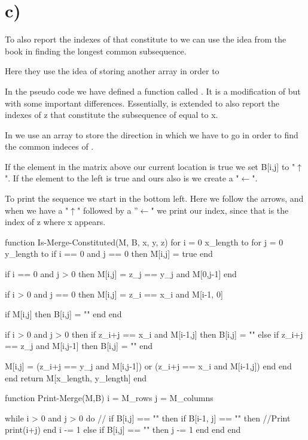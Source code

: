 \documentclass{article}
\begin{document}
\section*{c)}
To also report the indexes of  that constitute to  we can use the idea from the book in finding the longest common subsequence.

Here they use the idea of storing another array  in order to

In the pseudo code we have defined a function called . It is a modification of  but with some important differences. Essentially,  is extended to also report the indexes of z that constitute the subsequence of equal to x.

In  we use an array  to store the direction in which we have to go in order to find the common indeces of .

If the element in the matrix above our current location is true we set B[i,j] to "$\uparrow$". If the element to the left is true and ours also is we create a "$\leftarrow$".

To print the sequence we start in the bottom left. Here we follow the arrows, and when we have a "$\uparrow$" followed by a ”$\leftarrow$" we print our index, since that is the index of z where x appears.

\begin{pseudo}[span]
	function Is-Merge-Constituted(M, B, x, y, z)
	for i = 0 \rightarrow x_{length} to
		for j = 0 \rightarrow y_{length} to
			if i == 0 and j == 0 then
				M[i,j] = true
			end

			if i == 0 and j > 0 then
				M[i,j] = z_j == y_j and M[0,j-1]
			end

			if i > 0 and j == 0 then
				M[i,j] = z_i == x_i and M[i-1, 0]

				if M[i,j]  then
					B[i,j] = "\uparrow"
				end
			end

			if i > 0 and j > 0 then
				if z_{i+j} == x_i and M[i-1,j] then
					B[i,j] = "\uparrow"
				else if z_{i+j} == z_j and M[i,j-1] then
					B[i,j] = "\leftarrow"
				end

				M[i,j] = (z_{i+j} == y_j and M[i,j-1]) or (z_{i+j} == x_i and M[i-1,j])
			end
		end
	end
	return M[x_length, y_length]
	end

	function Print-Merge(M,B)
		i = M_{rows}
		j = M_{columns}

		while i > 0 and j > 0 do
			//
			if B[i,j] == "\uparrow" then
				if B[i-1, j] == "\leftarrow" then
					//Print 
					print(i+j)
				end
				i -= 1
			else if B[i,j] == "\leftarrow" then
				j -= 1
			end
		end
	end	
\end{pseudo}
\end{document}
